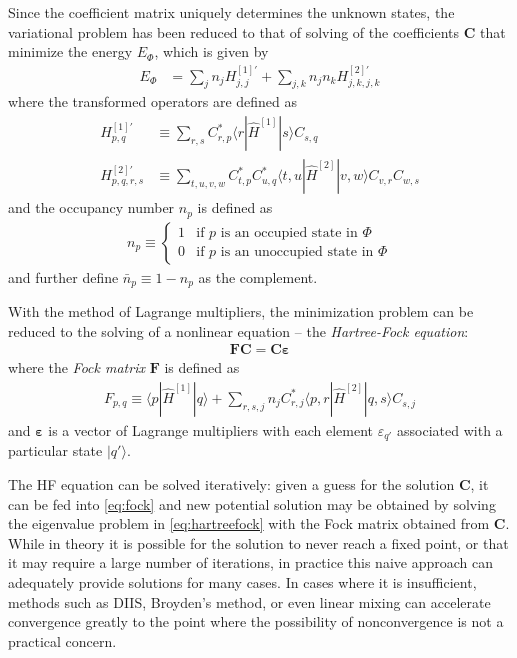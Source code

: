 Since the coefficient matrix uniquely determines the unknown states, the variational problem has been reduced to that of solving of the coefficients $\bm C$ that minimize the energy $E_{\Phi}$, which is given by
\begin{align}
  E_{\Phi} &= \sum_{j} n_j H^{[1] \prime}_{j, j} + \sum_{j, k} n_j n_k H^{[2] \prime}_{j, k, j, k} \label{eq:hfenergy}
\end{align}
where the transformed operators are defined as
\begin{align}
  H^{[1] \prime}_{p, q} &\equiv \sum_{r, s} C_{r, p}^* \langle r | \hat{H}^{[1]} | s \rangle C_{s, q}^{} \label{eq:hftransform1} \\
  H^{[2] \prime}_{p, q, r, s} &\equiv \sum_{t, u, v, w} C_{t, p}^* C_{u, q}^* \langle t, u | \hat{H}^{[2]} | v, w \rangle C_{v, r}^{} C_{w, s}^{} \label{eq:hftransform2}
\end{align}
and the occupancy number $n_p$ is defined as
\begin{align}
  n_p \equiv \begin{cases}
    1 & \text{if $p$ is an occupied state in $\Phi$} \\
    0 & \text{if $p$ is an unoccupied state in $\Phi$}
  \end{cases}
\end{align}
and further define $\bar n_p \equiv 1 - n_p$ as the complement.

With the method of Lagrange multipliers, the minimization problem can be reduced to the solving of a nonlinear equation -- the \textit{Hartree-Fock equation}:
\begin{align} \label{eq:hartreefock}
  \bm{F} \bm{C} = \bm{C} \bm{\varepsilon}
\end{align}
where the \textit{Fock matrix} $\bm F$ is defined as
\begin{align} \label{eq:fock}
  F_{p, q} \equiv \langle p | \hat{H}^{[1]} | q \rangle + \sum_{r, s, j} n_j C_{r, j}^* \langle p, r | \hat{H}^{[2]} | q, s \rangle C_{s, j}^{}
\end{align}
and $\bm{\varepsilon}$ is a vector of Lagrange multipliers with each element $\varepsilon_{q'}$ associated with a particular state $|q'\rangle$.

The HF equation can be solved iteratively: given a guess for the solution $\bm{C}$, it can be fed into \eqref{eq:fock} and new potential solution may be obtained by solving the eigenvalue problem in \eqref{eq:hartreefock} with the Fock matrix obtained from $\bm{C}$.  While in theory it is possible for the solution to never reach a fixed point, or that it may require a large number of iterations, in practice this naive approach can adequately provide solutions for many cases.  In cases where it is insufficient, methods such as DIIS, Broyden's method, or even linear mixing can accelerate convergence greatly to the point where the possibility of nonconvergence is not a practical concern.

